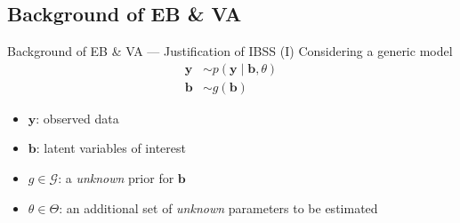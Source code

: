 \documentclass[10pt]{beamer}
\begin{document}
\subsection{Background of EB \& VA}

\begin{frame}{Background of EB \& VA --- \normalsize Justification of IBSS (I)}
    Considering a generic model
    \begin{align}
        \bm{y} & \sim p(\bm{y}\mid\bm{b},\theta) \\
        \bm{b} & \sim g(\bm{b})
    \end{align}
    \begin{itemize}
        \item $\bm{y}$: observed data
        \item $\bm{b}$: latent variables of interest
        \item $g\in\mathcal{G}$: a \textit{unknown} prior for $\bm{b}$
        \item $\theta\in\Theta$: an additional set of \textit{unknown} parameters to be estimated
    \end{itemize}

\end{frame}



\end{document}
